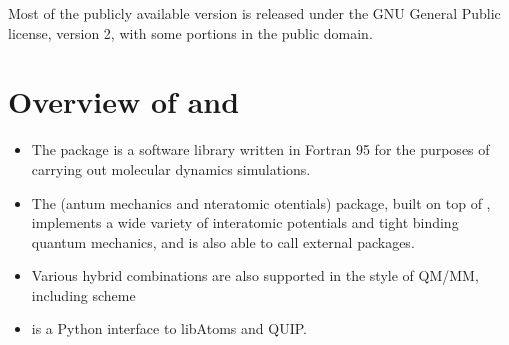 \documentclass[letterpaper,10pt,english]{sphinxmanual}
\begin{document}
Most of the publicly available version is released under the GNU
General Public license, version 2, with some portions in the public
domain.


\chapter{Overview of  and }
\label{\detokenize{index:overview-of-libatoms-and-quip}}\begin{itemize}
\item {} 
The  package is a software
library written in Fortran 95 for the purposes of carrying out
molecular dynamics simulations.

\item {} 
The  (antum mechanics and nteratomic
otentials) package, built on top of , implements a
wide variety of interatomic potentials and tight binding quantum
mechanics, and is also able to call external packages.

\item {} 
Various hybrid combinations are also supported in the style of
QM/MM, including  scheme 

\item {} 
 is a Python interface
to libAtoms and QUIP.

\end{itemize}
\end{document}

